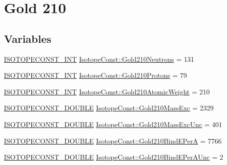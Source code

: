 \hypertarget{group___isotope_const-_gold-_au210}{}\section{Gold 210}
\label{group___isotope_const-_gold-_au210}
\subsection*{Variables}
\begin{DoxyCompactItemize}
\item 
\mbox{\hyperlink{group___isotope_const-_macros_ga5f18360b3e99483a35c32d789e62621c}{I\+S\+O\+T\+O\+P\+E\+C\+O\+N\+S\+T\+\_\+\+I\+NT}} \mbox{\hyperlink{group___isotope_const-_gold-_au210_gaf42c9a1f8fb2f87ce47d4ceca6205308}{Isotope\+Const\+::\+Gold210\+Neutrons}} = 131
\item 
\mbox{\hyperlink{group___isotope_const-_macros_ga5f18360b3e99483a35c32d789e62621c}{I\+S\+O\+T\+O\+P\+E\+C\+O\+N\+S\+T\+\_\+\+I\+NT}} \mbox{\hyperlink{group___isotope_const-_gold-_au210_ga0d2eaf7b0851b06227d1289438f77abd}{Isotope\+Const\+::\+Gold210\+Protons}} = 79
\item 
\mbox{\hyperlink{group___isotope_const-_macros_ga5f18360b3e99483a35c32d789e62621c}{I\+S\+O\+T\+O\+P\+E\+C\+O\+N\+S\+T\+\_\+\+I\+NT}} \mbox{\hyperlink{group___isotope_const-_gold-_au210_ga47c398882b4e9e13a329d811922395ff}{Isotope\+Const\+::\+Gold210\+Atomic\+Weight}} = 210
\item 
\mbox{\hyperlink{group___isotope_const-_macros_ga8f45a7272ce02c0b4c65c44636ed719a}{I\+S\+O\+T\+O\+P\+E\+C\+O\+N\+S\+T\+\_\+\+D\+O\+U\+B\+LE}} \mbox{\hyperlink{group___isotope_const-_gold-_au210_ga3a31f0ed5c1017b3e721daeeac10169e}{Isotope\+Const\+::\+Gold210\+Mass\+Exc}} = 2329
\item 
\mbox{\hyperlink{group___isotope_const-_macros_ga8f45a7272ce02c0b4c65c44636ed719a}{I\+S\+O\+T\+O\+P\+E\+C\+O\+N\+S\+T\+\_\+\+D\+O\+U\+B\+LE}} \mbox{\hyperlink{group___isotope_const-_gold-_au210_gac9187b4553c90d2734d99a10adc6265b}{Isotope\+Const\+::\+Gold210\+Mass\+Exc\+Unc}} = 401
\item 
\mbox{\hyperlink{group___isotope_const-_macros_ga8f45a7272ce02c0b4c65c44636ed719a}{I\+S\+O\+T\+O\+P\+E\+C\+O\+N\+S\+T\+\_\+\+D\+O\+U\+B\+LE}} \mbox{\hyperlink{group___isotope_const-_gold-_au210_gac6ceec4b9f2eb9b73eca1f4e22804c1f}{Isotope\+Const\+::\+Gold210\+Bind\+E\+PerA}} = 7766
\item 
\mbox{\hyperlink{group___isotope_const-_macros_ga8f45a7272ce02c0b4c65c44636ed719a}{I\+S\+O\+T\+O\+P\+E\+C\+O\+N\+S\+T\+\_\+\+D\+O\+U\+B\+LE}} \mbox{\hyperlink{group___isotope_const-_gold-_au210_gaff3702507d9487c37f95101625ac9b35}{Isotope\+Const\+::\+Gold210\+Bind\+E\+Per\+A\+Unc}} = 2

\end{DoxyCompactItemize}

